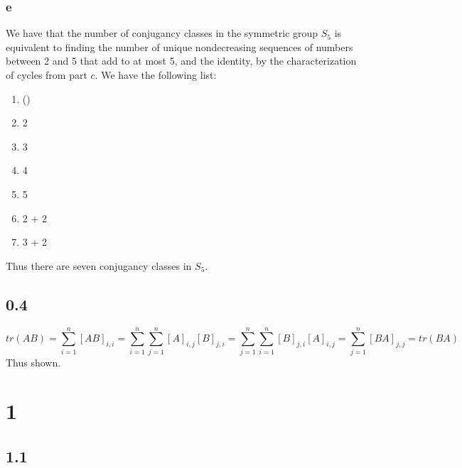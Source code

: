 \documentclass[]{article}
\begin{document}
\subsubsection*{e}
We have that the number of conjugancy classes in the symmetric group $S_5$ is equivalent to finding the number of unique nondecreasing sequences of numbers between 2 and 5 that add to at most 5, and the identity, by the characterization of cycles from part $c$.
We have the following list:
\begin{enumerate}
	\item ()
	\item 2
	\item 3
	\item 4
	\item 5
	\item 2 + 2
	\item 3 + 2
\end{enumerate}
Thus there are seven conjugancy classes in $S_5$.

\subsection*{0.4}
\begin{equation*}
tr(AB) = \sum_{i = 1}^n [AB]_{i,i} = \sum_{i = 1}^n \sum_{j = 1}^n [A]_{i,j} [B]_{j, i } = \sum_{j = 1}^n\sum_{i = 1}^n  [B]_{j, i }[A]_{i,j}   = \sum_{j = 1}^n [BA]_{j,j} = tr(BA)
\end{equation*}
Thus shown. 
\section*{1}
\subsection*{1.1}
\end{document}
